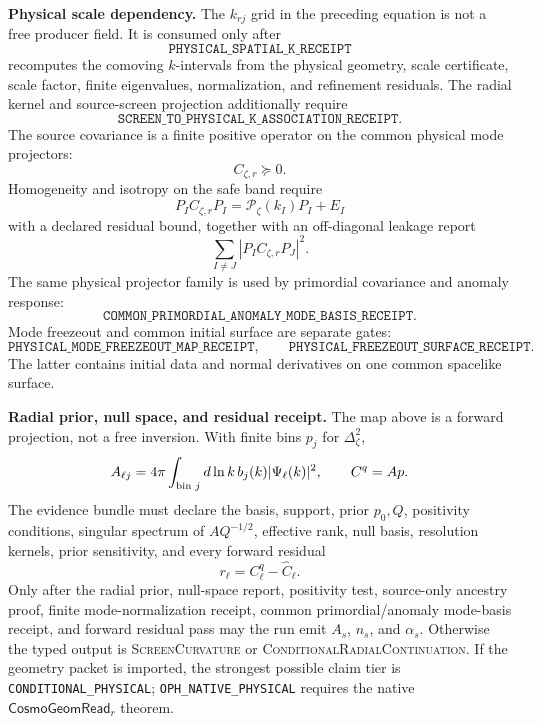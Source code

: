 \textbf{Physical scale dependency.}
The \(k_{rj}\) grid in the preceding equation is not a free producer field.  It is consumed only
after
\[
\texttt{PHYSICAL\_SPATIAL\_K\_RECEIPT}
\]
recomputes the comoving \(k\)-intervals from the physical geometry, scale certificate, scale factor,
finite eigenvalues, normalization, and refinement residuals.  The radial kernel and source-screen
projection additionally require
\[
\texttt{SCREEN\_TO\_PHYSICAL\_K\_ASSOCIATION\_RECEIPT}.
\]
The source covariance is a finite positive operator on the common physical mode projectors:
\[
C_{\zeta,r}\succeq0.
\]
Homogeneity and isotropy on the safe band require
\[
P_I C_{\zeta,r}P_I=\mathcal P_\zeta(k_I)P_I+E_I
\]
with a declared residual bound, together with an off-diagonal leakage report
\[
\sum_{I\ne J}|P_I C_{\zeta,r}P_J|^2.
\]
The same physical projector family is used by primordial covariance and anomaly response:
\[
\texttt{COMMON\_PRIMORDIAL\_ANOMALY\_MODE\_BASIS\_RECEIPT}.
\]
Mode freezeout and common initial surface are separate gates:
\[
\texttt{PHYSICAL\_MODE\_FREEZEOUT\_MAP\_RECEIPT},\qquad
\texttt{PHYSICAL\_FREEZEOUT\_SURFACE\_RECEIPT}.
\]
The latter contains initial data and normal derivatives on one common spacelike surface.

\textbf{Radial prior, null space, and residual receipt.}
The map above is a forward projection, not a free inversion.  With finite
bins \(p_j\) for \(\Delta_\zeta^2\),
\[
A_{\ell j}=4\pi\int_{\hbox{\scriptsize bin }j}d\ln k\,
b_j(k)|\Psi_\ell(k)|^2,
\qquad
C^q=Ap .
\]
The evidence bundle must declare the basis, support, prior \(p_0,Q\), positivity
conditions, singular spectrum of \(AQ^{-1/2}\), effective rank, null basis,
resolution kernels, prior sensitivity, and every forward residual
\[
r_\ell=C_\ell^q-\widehat C_\ell .
\]
Only after the radial prior, null-space report, positivity test, source-only
ancestry proof, finite mode-normalization receipt, common primordial/anomaly
mode-basis receipt, and forward residual pass may the run emit \(A_s\), \(n_s\),
and \(\alpha_s\).  Otherwise the typed output is
\textsc{ScreenCurvature} or \textsc{ConditionalRadialContinuation}.  If the
geometry packet is imported, the strongest possible claim tier is
\texttt{CONDITIONAL\_PHYSICAL}; \texttt{OPH\_NATIVE\_PHYSICAL} requires the
native \(\mathsf{CosmoGeomRead}_r\) theorem.

